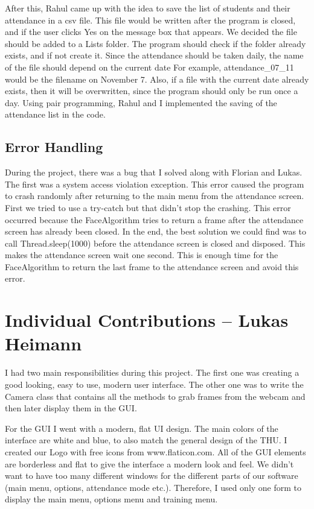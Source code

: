 \documentclass[12pt, a4paper]{article}
\begin{document}
After this, Rahul came up with the idea to save the list of students and their attendance in a csv file. This file would be written after the program is closed, and if the user clicks Yes on the message box that appears. We decided the file should be added to a Lists folder. The program should check if the folder already exists, and if not create it. Since the attendance should be taken daily, the name of the file should depend on the current date For example, attendance\_07\_11 would be the filename on November 7. Also, if a file with the current date already exists, then it will be overwritten, since the program should only be run once a day. Using pair programming, Rahul and I implemented the saving of the attendance list in the code.

\subsection{Error Handling}
During the project, there was a bug that I solved along with Florian and Lukas. The first was a system access violation exception. This error caused the program to crash randomly after returning to the main menu from the attendance screen. First we tried to use a try-catch but that didn’t stop the crashing. This error occurred because the FaceAlgorithm tries to return a frame after the attendance screen has already been closed. In the end, the best solution we could find was to call Thread.sleep(1000) before the attendance screen is closed and disposed. This makes the attendance screen wait one second. This is enough time for the FaceAlgorithm to return the last frame to the attendance screen and avoid this error.



\newpage


\section{Individual Contributions – Lukas Heimann}
I had two main responsibilities during this project. The first one was creating a good looking, easy to use, modern user interface. The other one was to write the Camera class that contains all the methods to grab frames from the webcam and then later display them in the GUI.

For the GUI I went with a modern, flat UI design. The main colors of the interface are white and blue, to also match the general design of the THU. I created our Logo with free icons from www.flaticon.com.\cite{Logo1} \cite{Logo2} All of the GUI elements are borderless and flat to give the interface a modern look and feel. We didn’t want to have too many different windows for the different parts of our software (main menu, options, attendance mode etc.). Therefore, I used only one form to display the main menu, options menu and training menu.
\end{document}
